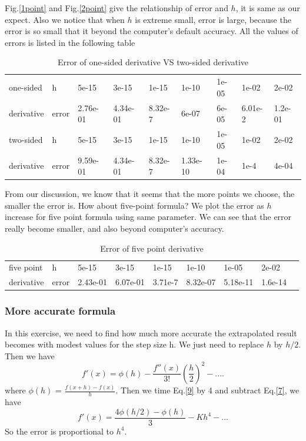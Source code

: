 \documentclass{article}
\begin{document}
Fig.\ref{1point} and Fig.\ref{2point} give the relationship of error and $h$, it is same as our expect. Also we notice that when $h$ is extreme small, error is large, because the error is so small that it beyond the computer's default accuracy. All the values of errors is listed in the following table
\begin{table}
\begin{center}
\begin{tabular}{ | l | l | l | l | l | | l | | l | l | l | }
\hline
one-sided   & h       &5e-15      & 3e-15      & 1e-15     & 1e-10      &1e-05  &1e-02    &2e-02  \\ 
derivative   & error & 2.76e-01 & 4.34e-01 &  8.32e-7 & 6e-07     & 6e-05  &6.01e-2 &1.2e-01\\ \hline
two-sided   & h       &5e-15       & 3e-15      & 1e-15     & 1e-10     &1e-05   &1e-02    &2e-02  \\ 
derivative   & error & 9.59e-01 & 4.34e-01 &  8.32e-7 & 1.33e-10 & 1e-04 &1e-4      &4e-04\\ \hline                                 
\end{tabular}
\caption {Error of one-sided derivative VS two-sided derivative} \label{tab}
\end{center}
\end{table}

From our discussion, we know that it seems that the more points we choose, the smaller the error is. How about five-point formula? We plot the error as $h$ increase for five point formula using same parameter. We can see that the error really become smaller, and also beyond computer's accuracy.
\begin{table}
\begin{center}
\begin{tabular}{ | l | l | l | l | l | | l | | l | l | l | }
\hline
five point    & h       &5e-15      & 3e-15      & 1e-15     & 1e-10      &1e-05         &2e-02  \\ 
derivative   & error & 2.43e-01 & 6.07e-01 &  3.71e-7 & 8.32e-07 & 5.18e-11  &1.6e-14\\ \hline                                 
\end{tabular}
\caption {Error of five point derivative} \label{tab}
\end{center}
\end{table}


\subsubsection{More accurate formula}
In this exercise, we need to find how much more accurate the extrapolated result becomes with modest values for the step size h. We just need to replace $h$ by $h/2$. Then we have
\begin{equation} \label{9}
f'(x) = \phi(h) - \frac{f''(x)}{3!}\left(\frac{h}{2}\right)^2 - ....
\end{equation}
where $\phi(h)$ = $\frac{f(x + h) - f(x)}{h}$. Then we time Eq.\ref{9} by 4 and subtract Eq.\ref{7}, we have
\begin{equation}
f'(x) = \frac{4 \phi(h/2) - \phi(h)}{3} - K h^4  - ...
\end{equation}
So the error is proportional to $h^4$.
\end{document}
